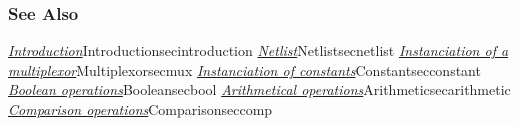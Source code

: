 \begin{htmlonly}

\subsubsection{See Also}

\hyperref[ref]{\emph{Introduction}}{}{Introduction}{secintroduction}
\hyperref[ref]{\emph{Netlist}}{}{Netlist}{secnetlist}
\hyperref[ref]{\emph{Instanciation of a multiplexor}}{}{Multiplexor}{secmux}
\hyperref[ref]{\emph{Instanciation of constants}}{}{Constant}{secconstant}
\hyperref[ref]{\emph{Boolean operations}}{}{Boolean}{secbool}
\hyperref[ref]{\emph{Arithmetical operations}}{}{Arithmetic}{secarithmetic}
\hyperref[ref]{\emph{Comparison operations}}{}{Comparison}{seccomp}

\end{htmlonly}
